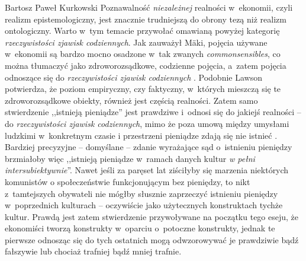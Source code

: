 \begin{artplenv}{Bartosz Paweł Kurkowski}
Poznawalność \textit{niezależnej} realności w~ekonomii, czyli realizm epistemologiczny, jest znacznie trudniejszą do
obrony tezą niż realizm ontologiczny. Warto w~tym temacie przywołać omawianą powyżej kategorię \textit{rzeczywistości
zjawisk codziennych}. Jak zauważył Mäki, pojęcia używane w~ekonomii są bardzo mocno osadzone w~tak zwanych
\textit{commonsensibles}, co można tłumaczyć jako zdroworozsądkowe, codzienne pojęcia, a~zatem pojęcia odnoszące się do
\textit{rzeczywistości zjawisk codziennych}
\parencite[s.~87]{kincaid_realistic_2009}.
Podobnie Lawson potwierdza,
że poziom empiryczny, czy faktyczny, w~których mieszczą się te zdroworozsądkowe obiekty, również jest częścią
realności. Zatem samo stwierdzenie ,,istnieją pieniądze'' jest prawdziwe i~odnosi się do jakiejś realności -- do
\textit{rzeczywistości zjawisk codziennych}, mimo że poza umową między umysłami ludzkimi w~konkretnym czasie i
przestrzeni pieniądze zdają się nie istnieć
\parencite[s.~269]{grobler_metodologia_2006}.
Bardziej precyzyjne -- domyślane -- zdanie wyrażające
sąd o~istnieniu pieniędzy brzmiałoby więc ,,istnieją pieniądze w~ramach danych kultur
\textit{w pełni intersubiektywnie}''. Nawet jeśli za paręset lat ziściłyby się marzenia niektórych komunistów o
społeczeństwie funkcjonującym bez pieniędzy, to nikt z~tamtejszych obywateli nie mógłby słusznie zaprzeczyć istnieniu
pieniędzy w~poprzednich kulturach -- oczywiście jako użytecznych konstruktach tychże kultur. Prawdą jest zatem
stwierdzenie przywoływane na początku tego eseju, że ekonomiści tworzą konstrukty w~oparciu o~potoczne konstrukty,
jednak te pierwsze odnosząc się do tych ostatnich mogą odwzorowywać je prawdziwie bądź fałszywie lub chociaż trafniej
bądź mniej trafnie.



\end{artplenv}
